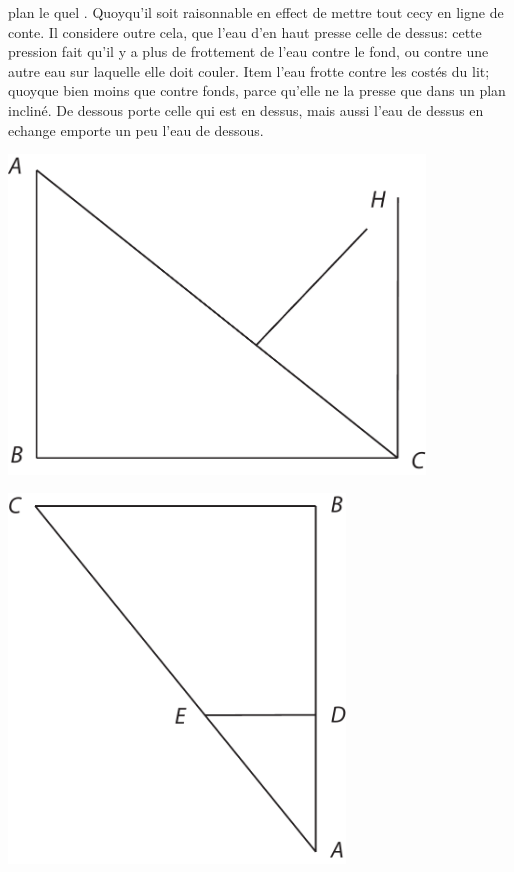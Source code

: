  plan  le quel . Quoyqu'il soit raisonnable en effect de mettre tout cecy en ligne de conte. Il considere outre cela, que l'eau d'en haut presse celle de dessus: cette pression\protect{} fait qu'il y a plus de frottement\protect{} de l'eau\protect{} contre le fond, ou contre une autre eau sur laquelle elle doit couler. Item l'eau frotte contre les costés du lit; quoyque bien moins que contre  fonds, parce qu'elle ne la presse que dans un plan incliné. De  dessous porte celle qui est en dessus, mais aussi l'eau de dessus en echange emporte un peu l'eau de dessous. 
\pend
\newpage
\pstart
\begin{minipage}[t]{0.5\textwidth}
\hspace*{-5mm}
\includegraphics[width=0.83\textwidth]{images/LH037,03_86r-d1.pdf}
\end{minipage}
\hspace*{7mm}
\begin{minipage}[t]{0.5\textwidth}
\includegraphics[width=0.67\textwidth]{images/LH037,03_86r-d2.pdf}
\end{minipage}
